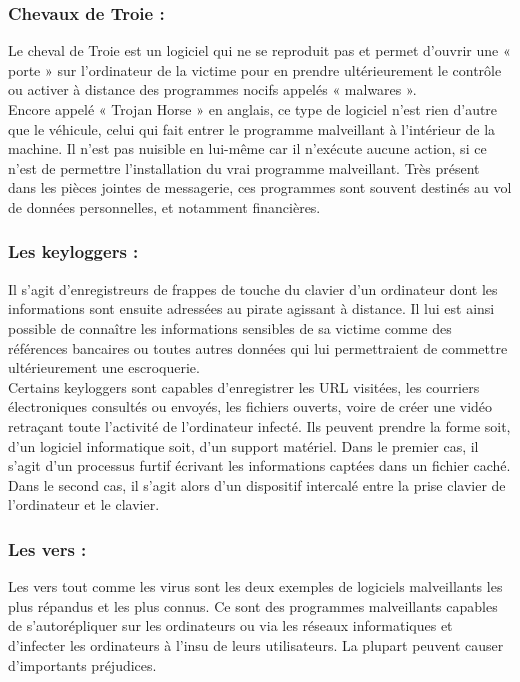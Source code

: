 \subsubsection{Chevaux de Troie : }
Le cheval de Troie est un logiciel qui ne se reproduit pas et permet d’ouvrir une « porte » sur l’ordinateur de la victime pour en prendre ultérieurement le contrôle ou activer à distance des programmes nocifs appelés « malwares ».\\ 

Encore appelé « Trojan Horse » en anglais, ce type de logiciel n’est rien d’autre que le véhicule, celui qui fait entrer le programme malveillant à l’intérieur de la machine. Il n’est pas nuisible en lui-même car il n’exécute aucune action, si ce n’est de permettre l’installation du vrai programme malveillant.
Très présent dans les pièces jointes de messagerie, ces programmes sont souvent destinés au vol de données personnelles, et notamment financières.
\subsubsection{Les keyloggers : }
Il s’agit d’enregistreurs de frappes de touche du clavier d’un ordinateur dont les informations sont ensuite adressées au pirate agissant à distance. Il lui est ainsi possible de connaître les informations sensibles de sa victime comme des références bancaires ou toutes autres données qui lui permettraient de commettre ultérieurement une escroquerie.\\

Certains keyloggers sont capables d’enregistrer les URL visitées, les courriers électroniques consultés ou envoyés, les fichiers ouverts, voire de créer une vidéo retraçant toute l’activité de l’ordinateur infecté. Ils peuvent prendre la forme soit, d’un logiciel informatique soit, d’un support matériel. Dans le premier cas, il s’agit d’un processus furtif écrivant les informations captées dans un fichier caché. Dans le second cas, il s’agit alors d’un dispositif intercalé entre la prise clavier de l’ordinateur et le clavier.
\subsubsection{Les vers : }
Les vers tout comme les virus sont les deux exemples de logiciels malveillants les plus répandus et les plus connus. Ce sont des programmes malveillants capables de s’autorépliquer sur les ordinateurs ou via les réseaux informatiques et d’infecter les ordinateurs à l’insu de leurs utilisateurs. La plupart peuvent causer d’importants préjudices.\\

